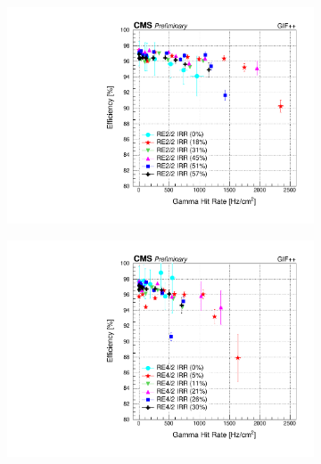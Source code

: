	\begin{figure}[H]
    	\begin{subfigure}{0.5\linewidth}
			\centering
    		\includegraphics[width = \linewidth]{fig/chapt5/RE2-2_IRR_Efficiency_vs_Rate.pdf}
        	\caption{\label{fig:GIFpp_eff_vs_rate:A}}
    	\end{subfigure}
    	\begin{subfigure}{0.5\linewidth}
			\centering
    		\includegraphics[width = \linewidth]{fig/chapt5/RE4-2_IRR_Efficiency_vs_Rate.pdf}
        	\caption{\label{fig:GIFpp_eff_vs_rate:B}}
    	\end{subfigure}
    	\begin{subfigure}{0.5\linewidth}
			\centering

\end{subfigure}
\end{figure}
